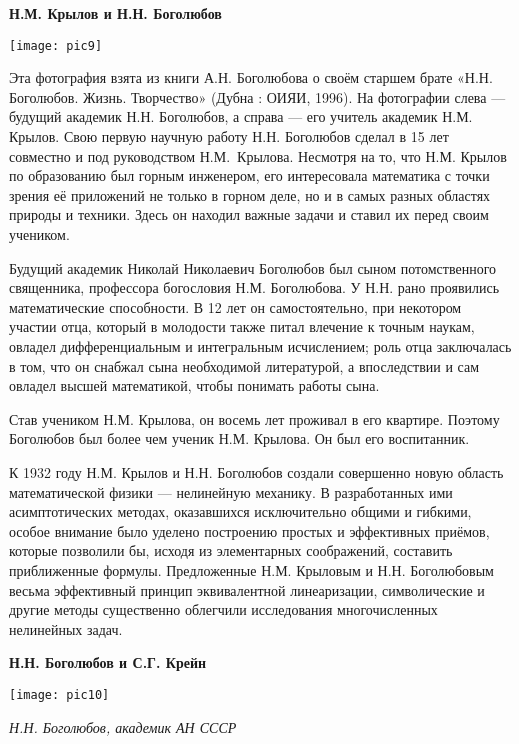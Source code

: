 \begin{center}
{\bf Н.М. Крылов и Н.Н. Боголюбов}

\vspace{3mm}

\texttt{[image: pic9]}

\end{center}

Эта фотография взята из книги А.Н. Боголюбова о своём старшем брате «Н.Н. Боголюбов. Жизнь. Творчество» (Дубна : ОИЯИ, 1996). На фотографии слева — будущий академик Н.Н. Боголюбов, а справа — его учитель академик Н.М. Крылов. Свою первую научную работу Н.Н. Боголюбов сделал в 15 лет совместно и под руководством Н.М.~Крылова. Несмотря на то, что Н.М. Крылов по образованию был горным инженером, его интересовала математика с точки зрения её приложений не только в горном деле, но и в самых разных областях природы и техники. Здесь он находил важные задачи и ставил их перед своим учеником.

Будущий академик Николай Николаевич Боголюбов был сыном потомственного священника, профессора богословия Н.М. Боголюбова. У Н.Н. рано проявились математические способности. В 12 лет он самостоятельно, при некотором участии отца, который в молодости также питал влечение к точным наукам, овладел дифференциальным и интегральным исчислением; роль отца заключалась в том, что он снабжал сына необходимой литературой, а впоследствии и сам овладел высшей математикой, чтобы понимать работы сына.

Став учеником Н.М. Крылова, он восемь лет проживал в его квартире. Поэтому Боголюбов был более чем ученик Н.М. Крылова. Он был его воспитанник.

 К 1932 году Н.М. Крылов и Н.Н. Боголюбов создали совершенно новую область математической физики — нелинейную механику. В разработанных ими асимптотических методах, оказавшихся исключительно общими и гибкими, особое внимание было уделено построению простых и эффективных приёмов, которые позволили бы, исходя из элементарных соображений, составить приближенные формулы. Предложенные Н.М. Крыловым и Н.Н. Боголюбовым весьма эффективный принцип эквивалентной линеаризации, символические и другие методы существенно облегчили исследования многочисленных нелинейных задач.

\begin{center}
{\bf Н.Н. Боголюбов и С.Г. Крейн}

\texttt{[image: pic10]}


{\it Н.Н. Боголюбов, академик АН СССР}
\end{center}

